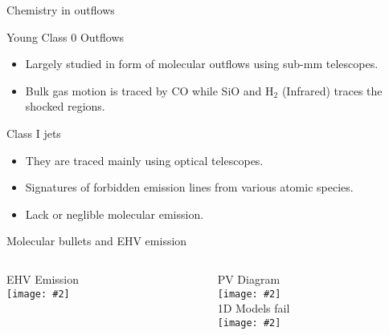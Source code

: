 \documentclass[8pt,xcolor=dvipsnames]{beamer}
\newcommand{\figpath}{./NEWFIGS/}
\newcommand{\spic}[2]{\texttt{[image: \#2]}}
\newcommand{\myref}[1]{{\small{\color{red}{(#1)}}}}
\begin{document}
\begin{frame}{Chemistry in outflows}
\begin{block}{Young Class 0 Outflows}
\begin{itemize}
\item Largely studied in form of molecular outflows using sub-mm
  telescopes.
\item Bulk gas motion is traced by CO while SiO and H$_{2}$ (Infrared) traces the shocked regions. 
\end{itemize}
\end{block}

\begin{block}{Class I jets}
\begin{itemize}
\item They are traced mainly using optical telescopes.
\item Signatures of forbidden emission lines from various atomic
  species.
\item Lack or neglible molecular emission. 
\end{itemize}
\end{block}
\end{frame}

\begin{frame}{Molecular bullets and EHV emission}
\begin{columns}

\begin{column}{0.4\textwidth}
\begin{center}
EHV Emission
\myref{Tafalla 2011}\\
\spic{0.33}{\figpath/EHVJets.png}
\end{center}
\end{column}
\hspace{0.05\textwidth}
\begin{column}{0.5\textwidth}
\begin{center}
PV Diagram \myref{Santiago-Garcia 2009}\\
\spic{0.25}{\figpath/EHVJets_PV.png}\\
1D Models fail \myref{Tafalla 2013} \\
\spic{0.35}{\figpath/EHVJets_Spec.png}
\end{center}
\end{column}
\end{columns}
\end{frame}
\end{document}
